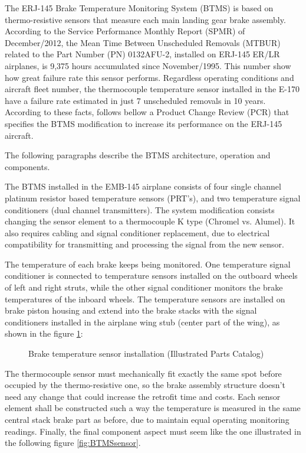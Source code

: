 The ERJ-145 Brake Temperature Monitoring System (BTMS) is based on thermo-resistive sensors that measure each main landing gear brake assembly. According to the Service Performance Monthly Report (SPMR) of December/2012, the Mean Time Between Unscheduled Removals (MTBUR) related to the Part Number (PN) 0132AFU-2, installed on ERJ-145 ER/LR airplanes, is 9,375 hours accumulated since November/1995. This number show how great failure rate this sensor performs. Regardless operating conditions and aircraft fleet number, the thermocouple temperature sensor installed in the E-170 have a failure rate estimated in just 7 unscheduled removals in 10 years. According to these facts, follows bellow a Product Change Review (PCR) that specifies the BTMS modification to increase its performance on the ERJ-145 aircraft.

The following paragraphs describe the BTMS architecture, operation and components.

The BTMS installed in the EMB-145 airplane consists of four single channel platinum resistor based temperature sensors (PRT's), and two temperature signal conditioners (dual channel transmitters). The system modification consists changing the sensor element to a thermocouple K type (Chromel vs. Alumel). It also requires cabling and signal conditioner replacement, due to electrical compatibility for transmitting and processing the signal from the new sensor.

The temperature of each brake keeps being monitored. One temperature signal conditioner is connected to temperature sensors installed on the outboard wheels of left and right struts, while the other signal conditioner monitors the brake temperatures of the inboard wheels. The temperature sensors are installed on brake piston housing and extend into the brake stacks with the signal conditioners installed in the airplane wing stub (center part of the wing), as shown in the figure \ref{fig:BTMSassembly}:

\begin{figure}[H] %
\caption{Brake temperature sensor installation (Illustrated Parts Catalog)}
\label{fig:BTMSassembly}
\end{figure}


The thermocouple sensor must mechanically fit exactly the same spot before occupied by the thermo-resistive one, so the brake assembly structure doesn't need any change that could increase the retrofit time and costs. Each sensor element shall be constructed such a way the temperature is measured in the same central stack brake part as before, due to maintain equal operating monitoring readings. Finally, the final component aspect must seem like the one illustrated in the following figure \ref{fig:BTMSsensor}.


